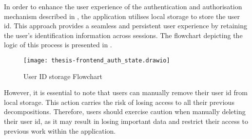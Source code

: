 In order to enhance the user experience of the authentication and authorisation
mechanism described in , the application utilises local
storage to store the user id. This approach provides a seamless and persistent
user experience by retaining the user's identification information across
sessions. The flowchart depicting the logic of this process is presented in
.

\begin{figure*}[!htb]
  \caption{User ID storage Flowchart}
  \label{fig:frontend_auth_state}
  \centering
  \texttt{[image: thesis-frontend\_auth\_state.drawio]}
\end{figure*}

However, it is essential to note that users can manually remove their user id
from local storage. This action carries the risk of losing access to all their
previous decompositions. Therefore, users should exercise caution when manually
deleting their user id, as it may result in losing important data and restrict
their access to previous work within the application.
